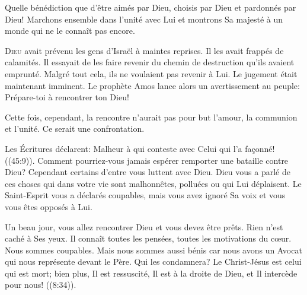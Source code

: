 Quelle bénédiction que d'être aimés par Dieu,
 choisis par Dieu et pardonnés par Dieu!
 Marchons ensemble dans l'unité avec Lui et montrons Sa majesté
 à un monde qui ne le connaît pas encore. 

\dvrule







\lettrine{D}{ieu} avait prévenu les gens d'Israël à maintes reprises.
 Il les avait frappés de calamités. Il essayait de les faire revenir
 du chemin de destruction qu'ils avaient emprunté.
 Malgré tout cela, ils ne voulaient pas revenir à Lui.
 Le jugement était maintenant imminent.
 Le prophète Amos lance alors un avertissement au peuple:
 \Og Prépare-toi à rencontrer ton Dieu! \Fg{}

Cette fois, cependant, la rencontre n'aurait pas pour but l'amour,
 la communion et l'unité. Ce serait une confrontation. 


Les Écritures déclarent: 
 \Og Malheur à qui conteste avec Celui qui l'a fa\c{c}onné! \Fg{}
 ((45:9)).
 Comment pourriez-vous jamais espérer remporter une bataille contre Dieu?
 Cependant certains d'entre vous luttent avec Dieu.
 Dieu vous a parlé de ces choses qui dans votre vie sont malhonnêtes,
 polluées ou qui Lui déplaisent. Le Saint-Esprit vous a déclarés coupables,
 mais vous avez ignoré Sa voix et vous vous êtes opposés à Lui. 

Un beau jour, vous allez rencontrer Dieu et vous devez être prêts.
 Rien n'est caché à Ses yeux. Il connaît toutes les pensées,
 toutes les motivations du c\oe{}ur. Nous sommes coupables.
 Mais nous sommes aussi bénis \ocadr car nous avons un Avocat qui nous
 représente devant le Père.
 \Og Qui les condamnera? Le Christ-Jésus est celui qui est mort;
 bien plus, Il est ressuscité, Il est à la droite de Dieu,
 et Il intercède pour nous! \Fg{} ((8:34)). 

